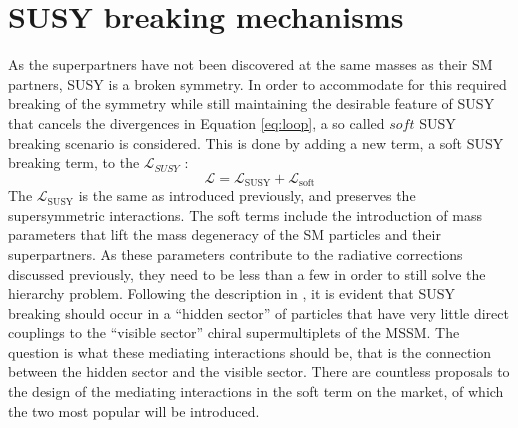 \section{SUSY breaking mechanisms}\label{sec:breaking}
\noindent\justify
As the superpartners have not been discovered at the same masses as their SM partners, SUSY is a broken symmetry. 
In order to accommodate for this required breaking of the symmetry while still maintaining the desirable feature of SUSY that cancels the divergences in Equation \ref{eq:loop}, a so called $soft$ SUSY breaking scenario is considered. 
This is done by adding a new term, a soft SUSY breaking term, to the $\mathcal{L}_{SUSY}$ \cite{soft,Chung:2003fi}:
\begin{equation}
\mathcal{L}=\mathcal{L}_{\mathrm{SUSY}}+\mathcal{L}_{\mathrm{soft}}
\label{eq:softterm}
\end{equation}
The $\mathcal{L}_{\mathrm{SUSY}}$ is the same as introduced previously, and preserves the supersymmetric interactions. 
The soft terms include the introduction of mass parameters that lift the mass degeneracy of the SM particles and their superpartners. 
As these parameters contribute to the radiative corrections discussed previously, they need to be less than a few \TeV in order to still solve the hierarchy problem. 
Following the description in \cite{Martin:1997ns}, it is evident that SUSY breaking should occur in a “hidden sector” of particles that have very little direct couplings to the “visible sector” chiral supermultiplets of the MSSM. 
The question is what these mediating interactions should be, that is the connection between the hidden sector and the visible sector. 
There are countless proposals to the design of the mediating interactions in the soft term on the market, of which the two most popular will be introduced. 
